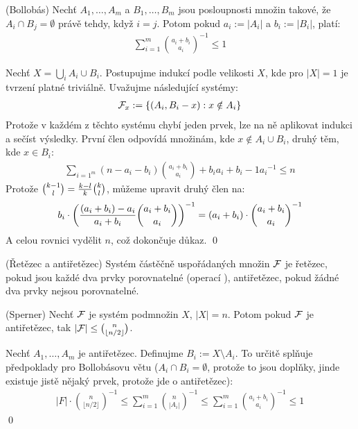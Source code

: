 \vt (Bollobás) Nechť $A_1, \dots, A_m$ a $B_1, \dots, B_m$ jsou posloupnosti 
množin takové, že $A_i \cap B_j = \emptyset$ právě tehdy, když $i = j$. Potom 
pokud $a_i := |A_i|$ a $b_i := |B_i|$, platí:
\begin{align}
	\sum_{i=1}^m\binom{a_i + b_i}{a_i}^{-1} \leq 1
\end{align}

\dk Nechť $X = \bigcup_i A_i \cup B_i$. Postupujme indukcí podle velikosti $X$, 
kde pro $|X| = 1$ je tvrzení platné triviálně. Uvažujme následující systémy:
\begin{align}
	\mathcal{F}_x := \{ (A_i, B_i - x) : x \notin A_i\}
\end{align}
Protože v každém z těchto systému chybí jeden prvek, lze na ně aplikovat indukci 
a sečíst výsledky. První člen odpovídá množinám, kde $x\notin A_i \cup B_i$, 
druhý těm, kde $x \in B_i$:
\begin{align}
	\sum_{i=1^m}(n-a_i-b_i) \binom{a_i+b_i}{a_i} + b_i{a_i+b_i-1}{a_i}^{-1} \leq 
	n
\end{align}
Protože $\binom{k-1}{l} = {k-l\over k}\binom{k}{l}$, můžeme upravit druhý člen 
na:
\begin{align}
	b_i \cdot \left({(a_i+b_i)-a_i \over a_i+b_i} 
	\binom{a_i+b_i}{a_i}\right)^{-1} = (a_i + b_i) \cdot 
	\binom{a_i+b_i}{a_i}^{-1}
\end{align}
A celou rovnici vydělit $n$, což dokončuje důkaz. \qed

\df (Řetězec a antiřetězec) Systém částěčně uspořádaných množin $\mathcal{F}$ je řetězec,
pokud jsou každé dva prvky porovnatelné (operací ), antiřetězec, 
pokud žádné dva prvky nejsou porovnatelné.

\vt (Sperner) Nechť $\mathcal{F}$ je systém podmnožin $X$, $|X| = n$. Potom pokud $\mathcal{F}$ je
antiřetězec, tak $|\mathcal{F}| \leq \binom{n}{\lfloor n/2 \rfloor}$.

\dk Nechť $A_1, \dots, A_m$ je antiřetězec. Definujme $B_i := X \setminus A_i$.  
To určitě splňuje předpoklady pro Bollobásovu větu ($A_i \cap B_i = \emptyset$, 
protože to jsou doplňky, jinde existuje jistě nějaký prvek, protože jde o 
antiřetězec):
\begin{align}
	|F| \cdot \binom{n}{\lfloor n/2 \rfloor}^{-1} \leq 
	\sum_{i=1}^m\binom{n}{|A_i|}^{-1} \leq \sum_{i=1}^m \binom{a_i + 
	b_i}{a_i}^{-1} \leq 1
\end{align}
\qed
